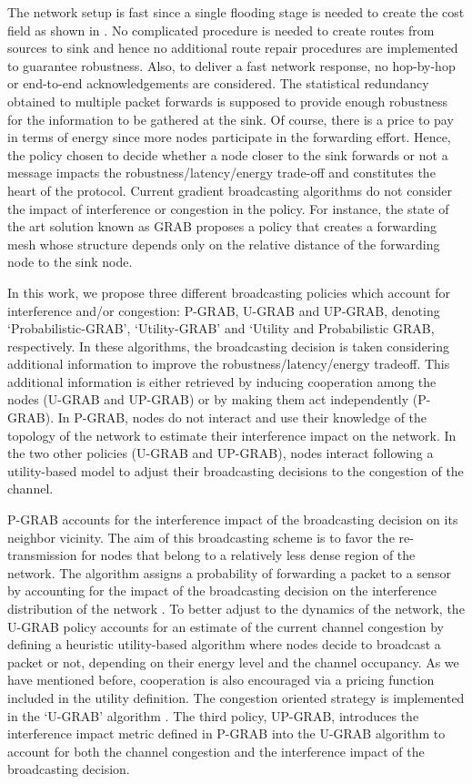 \documentclass[journal, peerreview, onecolumn, draftcls]{IEEEtran}
\begin{document}
The network setup is fast since a single flooding stage is needed to create the cost field as shown in \cite{GRAB01}. No complicated procedure is needed to create routes from sources to sink and hence no additional route repair procedures are implemented to guarantee robustness. Also, to deliver a fast network response, no hop-by-hop or end-to-end acknowledgements are considered. The statistical redundancy obtained to multiple packet forwards is supposed to provide enough robustness for the information to be gathered at the sink. Of course, there is a price to pay in terms of energy since more nodes participate in the forwarding effort.
Hence, the policy chosen to decide whether a node closer to the sink forwards or not a message impacts the robustness/latency/energy trade-off and constitutes the heart of the protocol.
Current gradient broadcasting algorithms do not consider the impact of interference or congestion in the policy. For instance, the state of the art solution known as GRAB \cite{GRAB05} proposes a policy that creates a forwarding mesh whose structure depends only on the relative distance of the forwarding node to the sink node.

In this work, we propose three different broadcasting policies which account for interference and/or congestion: P-GRAB, U-GRAB and UP-GRAB, denoting `Probabilistic-GRAB', `Utility-GRAB' and `Utility and Probabilistic GRAB, respectively.
In these algorithms, the broadcasting decision is taken considering additional information to improve the robustness/latency/energy tradeoff. This additional information is either retrieved by inducing cooperation among the nodes (U-GRAB and UP-GRAB) or by making them act independently (P-GRAB). In P-GRAB, nodes do not interact and use their knowledge of the topology of the network to estimate their interference impact on the network. In the two other policies (U-GRAB and UP-GRAB), nodes interact following a utility-based model to adjust their broadcasting decisions to the congestion of the channel.

P-GRAB accounts for the interference impact of the broadcasting decision on its neighbor vicinity. The aim of this broadcasting scheme is to favor the re-transmission for nodes that belong to a relatively less dense region of the network. The algorithm assigns a probability of forwarding a packet to a sensor by accounting for the impact of the broadcasting decision on the interference distribution of the network \cite{iswpc08}.
To better adjust to the dynamics of the network, the U-GRAB policy accounts for an estimate of the current channel congestion by defining a heuristic utility-based algorithm where nodes decide to broadcast a packet or not, depending on their energy level and the channel occupancy. As we have mentioned before, cooperation is also encouraged via a pricing function included in the utility definition. The congestion oriented strategy is implemented in the `U-GRAB' algorithm \cite{milcom09}.
The third policy, UP-GRAB, introduces the interference impact metric defined in P-GRAB into the U-GRAB algorithm to account for both the channel congestion and the interference impact of the broadcasting decision.
\end{document}
